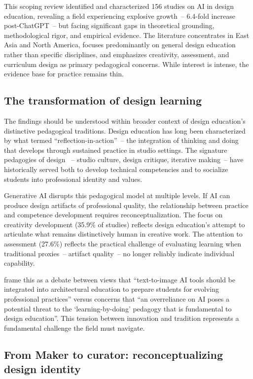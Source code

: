 \documentclass[ed]{acnsart}
\newcommand{\nstudies}{156}
\begin{document}
This scoping review identified and characterized \nstudies{} studies on AI in design education, revealing a field experiencing explosive growth~-- 6.4-fold increase post-ChatGPT~-- but facing significant gaps in theoretical grounding, methodological rigor, and empirical evidence. The literature concentrates in East Asia and North America, focuses predominantly on general design education rather than specific disciplines, and emphasizes creativity, assessment, and curriculum design as primary pedagogical concerns. While interest is intense, the evidence base for practice remains thin.

\subsection{The transformation of design learning}

The findings should be understood within broader context of design education's distinctive pedagogical traditions. Design education has long been characterized by what \citet{Schon1983} termed ``reflection-in-action''~-- the integration of thinking and doing that develops through sustained practice in studio settings. The signature pedagogies of design \cite{Shulman2005}~-- studio culture, design critique, iterative making~-- have historically served both to develop technical competencies and to socialize students into professional identity and values.

Generative AI disrupts this pedagogical model at multiple levels. If AI can produce design artifacts of professional quality, the relationship between practice and competence development requires reconceptualization. The focus on creativity development (35.9\% of studies) reflects design education's attempt to articulate what remains distinctively human in creative work. The attention to assessment (27.6\%) reflects the practical challenge of evaluating learning when traditional proxies~-- artifact quality~-- no longer reliably indicate individual capability.

\citet{Iranmanesh2024} frame this as a debate between views that ``text-to-image AI tools should be integrated into architectural education to prepare students for evolving professional practices'' versus concerns that ``an overreliance on AI poses a potential threat to the `learning-by-doing' pedagogy that is fundamental to design education''. This tension between innovation and tradition represents a fundamental challenge the field must navigate.

\subsection{From Maker to curator: reconceptualizing design identity}
\end{document}
